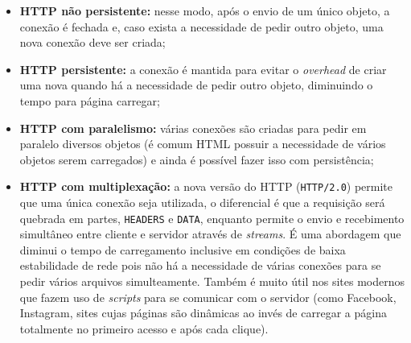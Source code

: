 \documentclass[brazilian,a4paper,twocolumn]{article}
\begin{document}
\begin{itemize}
    \item \textbf{HTTP não persistente:} nesse modo, após o envio de um único objeto, a conexão é fechada e, caso exista a necessidade de pedir outro objeto, uma nova conexão deve ser criada;
    \item \textbf{HTTP persistente:} a conexão é mantida para evitar o \textit{overhead} de criar uma nova quando há a necessidade de pedir outro objeto, diminuindo o tempo para página carregar;
    \item \textbf{HTTP com paralelismo:} várias conexões são criadas para pedir em paralelo diversos objetos (é comum HTML possuir a necessidade de vários objetos serem carregados) e ainda é possível fazer isso com persistência;
    \item \textbf{HTTP com multiplexação:} a nova versão do HTTP (\texttt{HTTP/2.0}) permite que uma única conexão seja utilizada, o diferencial é que a requisição será quebrada em partes, \texttt{HEADERS} e \texttt{DATA}, enquanto permite o envio e recebimento simultâneo entre cliente e servidor através de \textit{streams}. É uma abordagem que diminui o tempo de carregamento inclusive em condições de baixa estabilidade de rede pois não há a necessidade de várias conexões para se pedir vários arquivos simulteamente. Também é muito útil nos sites modernos que fazem uso de \textit{scripts} para se comunicar com o servidor (como Facebook, Instagram, sites cujas páginas são dinâmicas ao invés de carregar a página totalmente no primeiro acesso e após cada clique).
\end{itemize}
\end{document}
